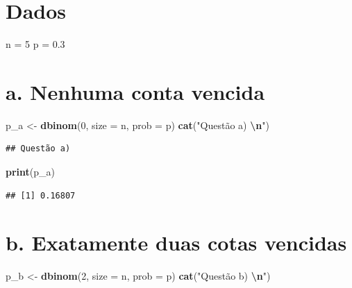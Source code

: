 \documentclass[
]{article}
\newenvironment{Shaded}{\begin{snugshade}}{\end{snugshade}}
\newcommand{\AttributeTok}[1]{\textcolor[rgb]{0.13,0.29,0.53}{#1}}
\newcommand{\DecValTok}[1]{\textcolor[rgb]{0.00,0.00,0.81}{#1}}
\newcommand{\FloatTok}[1]{\textcolor[rgb]{0.00,0.00,0.81}{#1}}
\newcommand{\FunctionTok}[1]{\textcolor[rgb]{0.13,0.29,0.53}{\textbf{#1}}}
\newcommand{\NormalTok}[1]{#1}
\newcommand{\OtherTok}[1]{\textcolor[rgb]{0.56,0.35,0.01}{#1}}
\newcommand{\SpecialCharTok}[1]{\textcolor[rgb]{0.81,0.36,0.00}{\textbf{#1}}}
\newcommand{\StringTok}[1]{\textcolor[rgb]{0.31,0.60,0.02}{#1}}
\begin{document}
\section{Dados}\label{dados-1}

\begin{Shaded}
\begin{Highlighting}[]
\NormalTok{n }\OtherTok{=} \DecValTok{5}
\NormalTok{p }\OtherTok{=} \FloatTok{0.3}
\end{Highlighting}
\end{Shaded}

\section{a. Nenhuma conta vencida}\label{a.-nenhuma-conta-vencida}

\begin{Shaded}
\begin{Highlighting}[]
\NormalTok{p\_a }\OtherTok{\textless{}{-}} \FunctionTok{dbinom}\NormalTok{(}\DecValTok{0}\NormalTok{, }\AttributeTok{size =}\NormalTok{ n, }\AttributeTok{prob =}\NormalTok{ p)}
\FunctionTok{cat}\NormalTok{(}\StringTok{"Questão a) }\SpecialCharTok{\textbackslash{}n}\StringTok{"}\NormalTok{)}
\end{Highlighting}
\end{Shaded}

\begin{verbatim}
## Questão a)
\end{verbatim}

\begin{Shaded}
\begin{Highlighting}[]
\FunctionTok{print}\NormalTok{(p\_a)}
\end{Highlighting}
\end{Shaded}

\begin{verbatim}
## [1] 0.16807
\end{verbatim}

\section{b. Exatamente duas cotas
vencidas}\label{b.-exatamente-duas-cotas-vencidas}

\begin{Shaded}
\begin{Highlighting}[]
\NormalTok{p\_b }\OtherTok{\textless{}{-}} \FunctionTok{dbinom}\NormalTok{(}\DecValTok{2}\NormalTok{, }\AttributeTok{size =}\NormalTok{ n, }\AttributeTok{prob =}\NormalTok{ p)}
\FunctionTok{cat}\NormalTok{(}\StringTok{"Questão b) }\SpecialCharTok{\textbackslash{}n}\StringTok{"}\NormalTok{)}
\end{Highlighting}
\end{Shaded}
\end{document}

